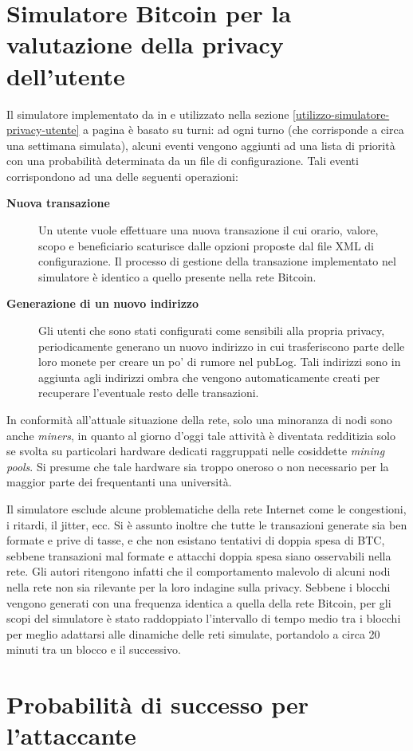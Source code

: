 \chapter{Simulatore Bitcoin per la valutazione della privacy dell'utente}

Il simulatore implementato da in \cite{user-privacy} e utilizzato nella sezione \ref{utilizzo-simulatore-privacy-utente} a pagina \pageref{utilizzo-simulatore-privacy-utente} è basato su turni: ad ogni turno (che corrisponde a circa una settimana simulata), alcuni eventi vengono aggiunti ad una lista di priorità con una probabilità determinata da un file di configurazione.
Tali eventi corrispondono ad una delle seguenti operazioni:

\begin{description}
    \item[\textbf{Nuova transazione}]
      Un utente vuole effettuare una nuova transazione il cui orario, valore, scopo e beneficiario scaturisce dalle opzioni proposte dal file XML di configurazione. Il processo di gestione della transazione implementato nel simulatore è identico a quello presente nella rete Bitcoin.
    \item[\textbf{Generazione di un nuovo indirizzo}]
      Gli utenti che sono stati configurati come sensibili alla propria privacy, periodicamente generano un nuovo indirizzo in cui trasferiscono parte delle loro monete per creare un po' di rumore nel pubLog. Tali indirizzi sono in aggiunta agli indirizzi ombra che vengono automaticamente creati per recuperare l'eventuale resto delle transazioni.
\end{description}

In conformità all'attuale situazione della rete, solo una minoranza di nodi sono anche \emph{miners}, in quanto al giorno d'oggi tale attività è diventata redditizia solo se svolta su particolari hardware dedicati raggruppati nelle cosiddette \emph{mining pools}. Si presume che tale hardware sia troppo oneroso o non necessario per la maggior parte dei frequentanti una università.

Il simulatore esclude alcune problematiche della rete Internet come le congestioni, i ritardi, il jitter, ecc.
Si è assunto inoltre che tutte le transazioni generate sia ben formate e prive di tasse, e che non esistano tentativi di doppia spesa di BTC, sebbene transazioni mal formate e attacchi doppia spesa siano osservabili nella rete.
Gli autori ritengono infatti che il comportamento malevolo di alcuni nodi nella rete non sia rilevante per la loro indagine sulla privacy.
Sebbene i blocchi vengono generati con una frequenza identica a quella della rete Bitcoin, per gli scopi del simulatore è stato raddoppiato l'intervallo di tempo medio tra i blocchi per meglio adattarsi alle dinamiche delle reti simulate, portandolo a circa 20 minuti tra un blocco e il successivo.

\chapter{Probabilità di successo per l'attaccante}\label{src-prob-nakamoto}


